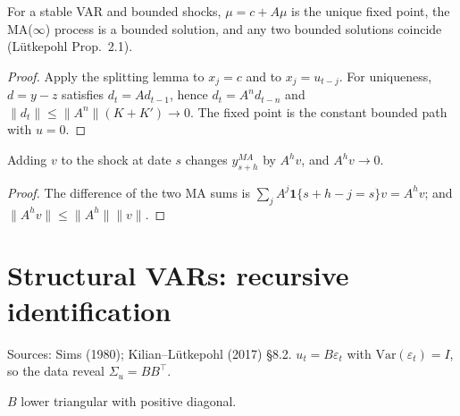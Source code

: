 \begin{theorem}
\label{thm:var-ma}
\leanok
{}
For a stable VAR and bounded shocks, $\mu = c + A\mu$ is the unique fixed point, the MA($\infty$) process is a bounded
solution, and any two bounded solutions coincide (L\"utkepohl Prop.~2.1).
\end{theorem}
\begin{proof}
\leanok
Apply the splitting lemma to $x_j = c$ and to $x_j = u_{t-j}$. For uniqueness, $d = y - z$ satisfies $d_t = Ad_{t-1}$,
hence $d_t = A^nd_{t-n}$ and $\|d_t\|\le\|A^n\|(K+K')\to0$. The fixed point is the constant bounded path with $u = 0$.
\end{proof}

\begin{theorem}
\label{thm:irf}
\leanok
{}
Adding $v$ to the shock at date $s$ changes $y^{MA}_{s+h}$ by $A^hv$, and $A^hv\to0$.
\end{theorem}
\begin{proof}
\leanok
The difference of the two MA sums is $\sum_jA^j\mathbf 1\{s+h-j = s\}v = A^hv$; and $\|A^hv\|\le\|A^h\|\|v\|$.
\end{proof}

\section{Structural VARs: recursive identification}
\label{sec:svar}

Sources: Sims (1980); Kilian--L\"utkepohl (2017) \S8.2. $u_t = B\varepsilon_t$ with $\mathrm{Var}(\varepsilon_t) = I$,
so the data reveal $\Sigma_u = BB^\top$.

\begin{definition}
\label{def:recursive}
\leanok
$B$ lower triangular with positive diagonal.
\end{definition}

